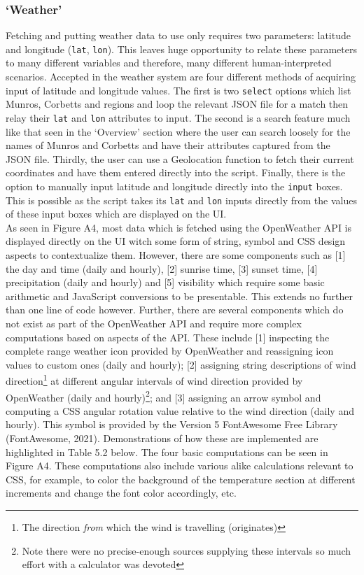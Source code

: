 \documentclass[11pt, english]{article}
\begin{document}
		\subsubsection{`Weather'}

	Fetching and putting weather data to use only requires two parameters: latitude and longitude (\texttt{lat}, \texttt{lon}). This leaves huge opportunity to relate these parameters to many different variables and therefore, many different human-interpreted scenarios. Accepted in the weather system are four different methods of acquiring input of latitude and longitude values. The first is two \texttt{select} options which list Munros, Corbetts and regions and loop the relevant JSON file for a match then relay their \texttt{lat} and \texttt{lon} attributes to input. The second is a search feature much like that seen in the `Overview' section where the user can search loosely for the names of Munros and Corbetts and have their attributes captured from the JSON file. Thirdly, the user can use a Geolocation function to fetch their current coordinates and have them entered directly into the script. Finally, there is the option to manually input latitude and longitude directly into the \texttt{input} boxes. This is possible as the script takes its \texttt{lat} and \texttt{lon} inputs directly from the values of these input boxes which are displayed on the UI.\\

	As seen in Figure A4, most data which is fetched using the OpenWeather API is displayed directly on the UI witch some form of string, symbol and CSS design aspects to contextualize them. However, there are some components such as [1] the day and time (daily and hourly), [2] sunrise time, [3] sunset time, [4] precipitation (daily and hourly) and [5] visibility which require some basic arithmetic and JavaScript conversions to be presentable. This extends no further than one line of code however. Further, there are several components which do not exist as part of the OpenWeather API and require more complex computations based on aspects of the API. These include [1] inspecting the complete range weather icon provided by OpenWeather and reassigning icon values to custom ones (daily and hourly); [2] assigning string descriptions of wind direction\footnote{The direction \textit{from} which the wind is travelling (originates)} at different angular intervals of wind direction provided by OpenWeather (daily and hourly)\footnote{Note there were no precise-enough sources supplying these intervals so much effort with a calculator was devoted}; and [3] assigning an arrow symbol and computing a CSS angular rotation value relative to the wind direction (daily and hourly). This symbol is provided by the Version 5 FontAwesome Free Library (FontAwesome, 2021). Demonstrations of how these are implemented are highlighted in Table 5.2 below. The four basic computations can be seen in Figure A4. These computations also include various alike calculations relevant to CSS, for example, to color the background of the temperature section at different increments and change the font color accordingly, etc.
\end{document}
